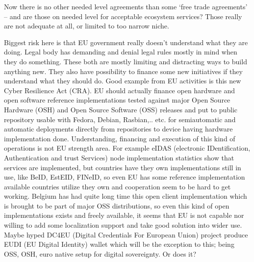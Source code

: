 Now there is no other needed level agreements than some `free trade
agreements' -- and are those on needed level for acceptable ecosystem
services? Those really are not adequate at all, or limited to too narrow
niche.

Biggest risk here is that EU government really doesn't understand what they
are doing. Legal body has demanding and denial legal rules mostly in mind
when they do something. These both are mostly limiting and distracting ways
to build anything new. They also have possibility to finance some new
initiatives if they understand what they should do. Good example from EU
activities is this new Cyber Resilience Act (CRA)\allowbreak\cite{EU_CRA}. EU
should actually finance open hardware and open software reference
implementations tested against major Open Source Hardware (OSH) and Open
Source Software (OSS) releases and put to public repository usable with
Fedora, Debian, Rasbian,.. etc. for semiautomatic and automatic deployments
directly from repositories to device having hardware
implementation\allowbreak\cite{ISO_IEC_19790} done. Understanding, financing
and execution of this kind of operations is not EU strength area. For example
eIDAS (electronic IDentification, Authentication and trust Services) node
implementation statistics\allowbreak\cite{eIDASnode} show that services are
implemented, but countries have they own implementations still in use, like
BeID, EstEID, FINeID, so even EU has some reference implementation available
countries utilize they own and cooperation seem to be hard to get working.
Belgium has had quite long time this open client implementation which is
brought to be part of major OSS distributions, so even this kind of open
implementations exists and freely available, it seems that EU is not capable
nor willing to add some localization support and take good solution into
wider use. Maybe hyped DC4EU (Digital Credentials For European Union)
project\allowbreak\cite{DC4EU} produce EUDI (EU Digital Identity)
wallet\allowbreak\cite{EUDIW} which will be the exception to this;
being OSS, OSH, euro native setup for digital sovereignty. Or does it?

